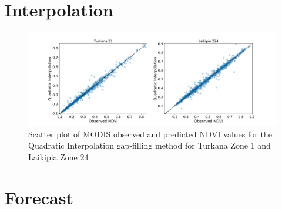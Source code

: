 \documentclass[review]{elsarticle}
\begin{document}
\newpage
\section{Interpolation}
\begin{figure} 
	\centering
	\includegraphics[trim = 15mm 0mm 0mm 0mm,width=15cm]{figures/TurkanaZ1_LaikipiaZ24_Quadratic_Scatter1.pdf} 
	\caption{Scatter plot of MODIS observed and predicted NDVI values for the Quadratic Interpolation gap-filling method for Turkana Zone 1 and Laikipia Zone 24} \label{fig:interpScatter}
\end{figure}






\newpage

\section{Forecast}
\end{document}
